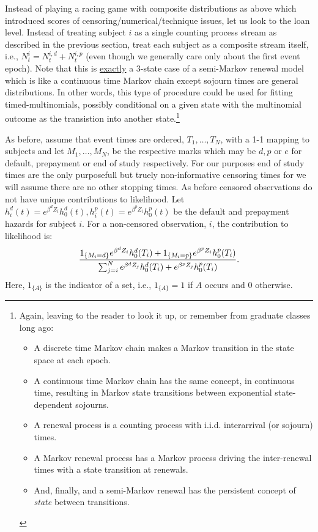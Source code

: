 \documentclass[10pt]{article}
\begin{document}
Instead of playing a racing game with composite distributions as above which introduced scores of censoring/numerical/technique issues, let us 
look to the loan level.  Instead of treating subject $i$ as a single counting process stream as described in the previous section, treat each subject as a 
composite stream itself, i.e., $N^i_t=N^{i,d}_t+N^{i,p}_t$ (even though we generally care only about the first event epoch).
Note that 
this is \underline{exactly} a 3-state case of a semi-Markov renewal model which is like a continuous 
time Markov chain except sojourn times are general distributions.  In other words, this type of procedure could be used for fitting timed-multinomials, 
possibly conditional on a given state with the multinomial outcome as the transistion into another state.\footnote{Again, leaving to the
reader to look it up, or remember from graduate classes long ago:   
\begin{itemize}
    \item A discrete time Markov chain makes a Markov transition in the state space at each epoch. 
    \item A continuous time Markov chain has the same concept, in continuous time, resulting in Markov state transitions between 
exponential state-dependent sojourns.  
    \item A renewal process is a counting process with i.i.d. interarrival (or sojourn) times.  
    \item A Markov renewal process has a Markov process driving the inter-renewal times with a state transition at renewals.
    \item And, finally, and a semi-Markov renewal has the persistent concept of {\em state}
between transitions.
\end{itemize}
}


As before, assume that event times are ordered, $T_1, \ldots, T_N$, with a 1-1 mapping to subjects and let $M_1, \ldots, M_N$, be the respective marks which 
may be $d, p$ or $e$ for default, prepayment or end of study respectively.  For our purposes end of study times are the only purposefull but truely non-informative 
censoring times for we will assume there are no other stopping times.  As before censored observations do not have unique contributions to likelihood.  Let 
$h^d_i(t)=e^{\beta^d Z_i}h^d_0(t), h^p_i(t)=e^{\beta^p Z_i}h^p_0(t)$ be the default and prepayment hazards for subject $i$.
For a non-censored observation, $i$, the contribution to likelihood is:
$$ {{1_{\{M_i=d\}}e^{\beta^d Z_i}h^d_0(T_i)+1_{\{M_i=p\}}e^{\beta^p Z_i}h^p_0(T_i) } 
\over { \sum_{j=i}^N e^{\beta^d Z_j}h^d_0(T_i)+e^{\beta^p Z_j}h^p_0(T_i) } }.$$
Here, $1_{\{A\}}$ is the indicator of a set, i.e., $1_{\{A\}}=1$ if $A$ occurs and 0 otherwise.
\end{document}
